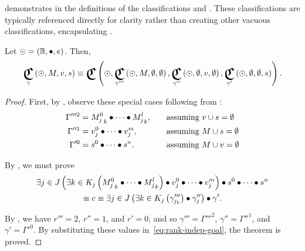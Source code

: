  demonstrates  in the
  definitions of the classifications  and
  .
These classifications are typically referenced directly for clarity rather
  than creating other vacuous classifications,
    encapsulating .


\begin{theorem}
  Let $\odot=\left({\mathbb{B}},{\bullet},{e}\right)$.
  Then,
  \begin{equation}
    \Classify_\gamma\left(\odot,M,v,s\right)
      \equiv \Classify\left(
        \odot,
        \Classify_{\gamma'''}\left(\odot,M,\emptyset,\emptyset\right),
        \Classify_{\gamma''}\left(\odot,\emptyset,v,\emptyset\right),
        \Classify_{\gamma'}\left(\odot,\emptyset,\emptyset,s\right)
      \right).
  \end{equation}
\end{theorem}

\begin{proof}
  First,
    by ,
    observe these special cases following from :
  \begin{equation}
  \begin{alignedat}{3}
    \Gamma'''^2 &= {M^0_j}_k \bullet\cdots\bullet {M^l_j}_k, \qquad&&\text{assuming $v\cup s=\emptyset$} \\
    \Gamma''^1 &= v^0_j\bullet\cdots\bullet v^m_j,        &&\text{assuming $M\cup s=\emptyset$} \\
    \Gamma'^0 &= s^0\bullet\cdots\bullet s^n.      &&\text{assuming $M\cup v=\emptyset$}
  \end{alignedat}
  \end{equation}

  By ,
    we must prove
  \begin{multline}\label{eq:rank-indep-goal}
    \Exists{j\in J}{
        \Exists{k\in K_j}{\cpredmatseq}
        \monoidop \cpredvecseq
      }
      \monoidop \cpredscalarseq \\
    \equiv c \equiv
    \Exists{j\in J}{
        \Exists{k\in K_j}{\gamma'''_{j_k}}
        \monoidop \gamma''_j
      }
      \monoidop \gamma'.
  \end{multline}

  By ,
    we have $r'''=2$, $r''=1$, and $r'=0$,
    and so $\gamma'''=\Gamma'''^2$,
      $\gamma''=\Gamma''^1$,
      and $\gamma'=\Gamma'^0$.
  By substituting these values in~\ref{eq:rank-indep-goal},
    the theorem is proved.
\end{proof}

